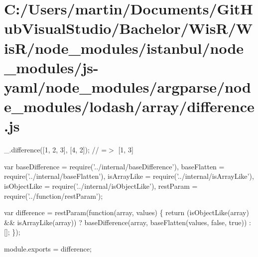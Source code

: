 \hypertarget{_c_1_2_users_2martin_2_documents_2_git_hub_visual_studio_2_bachelor_2_wis_r_2_wis_r_2node_modulee21003b828b8b46f0a0e137a54c15fb1}{}\section{C\+:/\+Users/martin/\+Documents/\+Git\+Hub\+Visual\+Studio/\+Bachelor/\+Wis\+R/\+Wis\+R/node\+\_\+modules/istanbul/node\+\_\+modules/js-\/yaml/node\+\_\+modules/argparse/node\+\_\+modules/lodash/array/difference.\+js}
\+\_\+.\+difference(\mbox{[}1, 2, 3\mbox{]}, \mbox{[}4, 2\mbox{]}); // =$>$ \mbox{[}1, 3\mbox{]}


\begin{DoxyCodeInclude}
var baseDifference = require(\textcolor{stringliteral}{'../internal/baseDifference'}),
    baseFlatten = require(\textcolor{stringliteral}{'../internal/baseFlatten'}),
    isArrayLike = require(\textcolor{stringliteral}{'../internal/isArrayLike'}),
    isObjectLike = require(\textcolor{stringliteral}{'../internal/isObjectLike'}),
    restParam = require(\textcolor{stringliteral}{'../function/restParam'});

var difference = restParam(\textcolor{keyword}{function}(array, values) \{
  \textcolor{keywordflow}{return} (isObjectLike(array) && isArrayLike(array))
    ? baseDifference(array, baseFlatten(values, \textcolor{keyword}{false}, \textcolor{keyword}{true}))
    : [];
\});

module.exports = difference;
\end{DoxyCodeInclude}
 